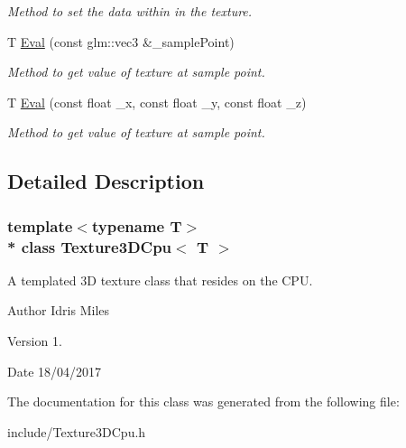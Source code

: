 \begin{DoxyCompactItemize}
\begin{DoxyCompactList}\small\item\em Method to set the data within in the texture. \end{DoxyCompactList}\item 
T \hyperlink{classTexture3DCpu_ac5f8ce26e92790968ffe6a04b0dd9765}{Eval} (const glm\+::vec3 \&\+\_\+sample\+Point)\hypertarget{classTexture3DCpu_ac5f8ce26e92790968ffe6a04b0dd9765}{}\label{classTexture3DCpu_ac5f8ce26e92790968ffe6a04b0dd9765}

\begin{DoxyCompactList}\small\item\em Method to get value of texture at sample point. \end{DoxyCompactList}\item 
T \hyperlink{classTexture3DCpu_a7ab6209c0bbf14009a9e7e4c0b101b95}{Eval} (const float \+\_\+x, const float \+\_\+y, const float \+\_\+z)\hypertarget{classTexture3DCpu_a7ab6209c0bbf14009a9e7e4c0b101b95}{}\label{classTexture3DCpu_a7ab6209c0bbf14009a9e7e4c0b101b95}

\begin{DoxyCompactList}\small\item\em Method to get value of texture at sample point. \end{DoxyCompactList}\end{DoxyCompactItemize}


\subsection{Detailed Description}
\subsubsection*{template$<$typename T$>$\\*
class Texture3\+D\+Cpu$<$ T $>$}

A templated 3D texture class that resides on the C\+PU. 

\begin{DoxyAuthor}{Author}
Idris Miles 
\end{DoxyAuthor}
\begin{DoxyVersion}{Version}
1. 
\end{DoxyVersion}
\begin{DoxyDate}{Date}
18/04/2017 
\end{DoxyDate}


The documentation for this class was generated from the following file\+:\begin{DoxyCompactItemize}
\item 
include/Texture3\+D\+Cpu.\+h\end{DoxyCompactItemize}
